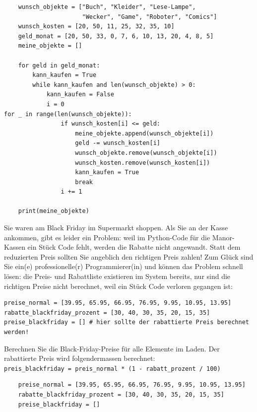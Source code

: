 \begin{questions}
\begin{solution}
    \begin{lstlisting}
    wunsch_objekte = ["Buch", "Kleider", "Lese-Lampe",
                      "Wecker", "Game", "Roboter", "Comics"]
    wunsch_kosten = [20, 50, 11, 25, 32, 35, 10]
    geld_monat = [20, 50, 33, 0, 7, 6, 10, 13, 20, 4, 8, 5]
    meine_objekte = []

    for geld in geld_monat:
        kann_kaufen = True
        while kann_kaufen and len(wunsch_objekte) > 0:
            kann_kaufen = False
            i = 0
for _ in range(len(wunsch_objekte)):
                if wunsch_kosten[i] <= geld:
                    meine_objekte.append(wunsch_objekte[i])
                    geld -= wunsch_kosten[i]
                    wunsch_objekte.remove(wunsch_objekte[i])
                    wunsch_kosten.remove(wunsch_kosten[i])
                    kann_kaufen = True
                    break
                i += 1

    print(meine_objekte)
    \end{lstlisting}

  \end{solution}

\clearpage
{}

Sie waren am Black Friday im Supermarkt shoppen. Als Sie an der Kasse ankommen, gibt es leider ein Problem: weil im Python-Code für die Manor-Kassen ein Stück Code fehlt, werden die Rabatte nicht angewandt. Statt dem reduzierten Preis sollten Sie angeblich den richtigen Preis zahlen! Zum Glück sind Sie ein(e) professionelle(r) Programmierer(in) und können das Problem schnell lösen: die Preis- und Rabattliste existieren im System bereits, nur sind die richtigen Preise nicht berechnet, weil ein Stück Code verloren gegangen ist:
\begin{lstlisting}
preise_normal = [39.95, 65.95, 66.95, 76.95, 9.95, 10.95, 13.95]
rabatte_blackfriday_prozent = [30, 40, 30, 35, 20, 15, 35]
preise_blackfriday = [] # hier sollte der rabattierte Preis berechnet werden!
\end{lstlisting}
Berechnen Sie die Black-Friday-Preise für alle Elemente im Laden. Der rabattierte Preis wird folgendermassen berechnet:\\
	\lstinline|preis_blackfriday = preis_normal * (1 - rabatt_prozent / 100)|
	\begin{solution}
    \begin{lstlisting}
    preise_normal = [39.95, 65.95, 66.95, 76.95, 9.95, 10.95, 13.95]
    rabatte_blackfriday_prozent = [30, 40, 30, 35, 20, 15, 35]
    preise_blackfriday = []


\end{lstlisting}
\end{solution}
\end{questions}

